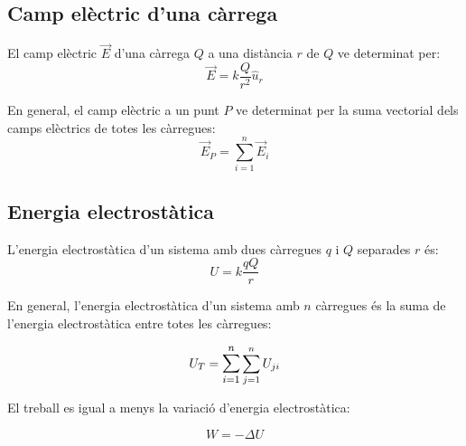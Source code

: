 \subsection{Camp elèctric d'una càrrega}
\label{sub:camp_electric_duna_carrega}

\begin{multicols}{2}


    El camp elèctric $\vec{E}$ d'una càrrega $Q$ a una distància $r$ de $Q$ ve determinat per:
    \begin{equation}
        \vec{E} = k\frac{Q}{r^2} \hat{u}_r
    \end{equation}

    \columnbreak

    En general, el camp elèctric a un punt $P$ ve determinat per la suma vectorial
    dels camps elèctrics de totes les càrregues:
    \begin{equation}
        \vec{E}_P = \sum_{i=1}^n \vec{E}_i 
    \end{equation}


\end{multicols}



\subsection{Energia electrostàtica}
\begin{multicols}{2}

    \label{sub:energia_electrostatica}
    L'energia electrostàtica d'un sistema amb dues càrregues $q$ i $Q$ separades $r$ és:
    \begin{equation}
        U = k \frac{qQ}{r}
    \end{equation}

    En general, l'energia electrostàtica d'un sistema amb $n$ càrregues és la suma
    de l'energia electrostàtica entre totes les càrregues:

    \begin{equation}
        U_T = \mathlarger{\sum_{i=1}^n} \sum_{j=1}^n U_{ji}
    \end{equation}

    El treball es igual a menys la variació d'energia electrostàtica:

    \begin{equation}
        W = - \Delta U
    \end{equation}

\end{multicols}

